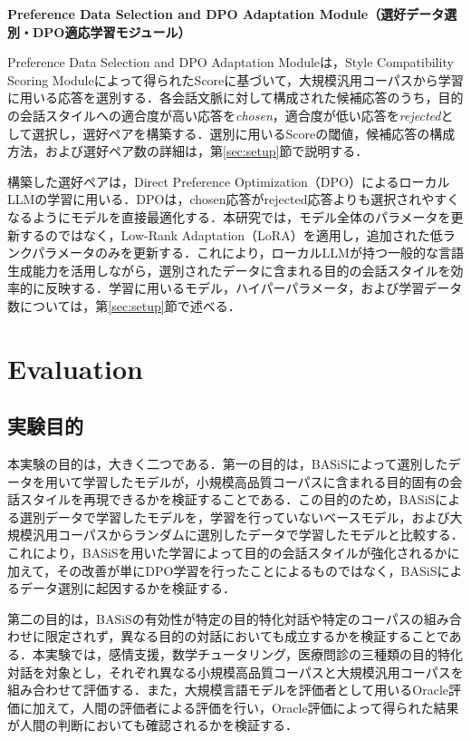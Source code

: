 \documentclass[manuscript,review,anonymous]{acmart}
\begin{document}
\label{mod:preference_adaptation}
\noindent\textbf{Preference Data Selection and DPO Adaptation Module（選好データ選別・DPO適応学習モジュール）}\par

Preference Data Selection and DPO Adaptation Moduleは，Style Compatibility Scoring Moduleによって得られたScoreに基づいて，大規模汎用コーパスから学習に用いる応答を選別する．各会話文脈に対して構成された候補応答のうち，目的の会話スタイルへの適合度が高い応答を\emph{chosen}，適合度が低い応答を\emph{rejected}として選択し，選好ペアを構築する．選別に用いるScoreの閾値，候補応答の構成方法，および選好ペア数の詳細は，第\ref{sec:setup}節で説明する．

構築した選好ペアは，Direct Preference Optimization（DPO）\cite{rafailov2023dpo}によるローカルLLMの学習に用いる．DPOは，chosen応答がrejected応答よりも選択されやすくなるようにモデルを直接最適化する．本研究では，モデル全体のパラメータを更新するのではなく，Low-Rank Adaptation（LoRA）\cite{hu2021lora}を適用し，追加された低ランクパラメータのみを更新する．これにより，ローカルLLMが持つ一般的な言語生成能力を活用しながら，選別されたデータに含まれる目的の会話スタイルを効率的に反映する．学習に用いるモデル，ハイパーパラメータ，および学習データ数については，第\ref{sec:setup}節で述べる．


\section{Evaluation}
\label{sec:evaluation}
\label{sec:setup}

\subsection{実験目的}
\label{sec:eval_objectives}

本実験の目的は，大きく二つである．第一の目的は，BASiSによって選別したデータを用いて学習したモデルが，小規模高品質コーパスに含まれる目的固有の会話スタイルを再現できるかを検証することである．この目的のため，BASiSによる選別データで学習したモデルを，学習を行っていないベースモデル，および大規模汎用コーパスからランダムに選別したデータで学習したモデルと比較する．これにより，BASiSを用いた学習によって目的の会話スタイルが強化されるかに加えて，その改善が単にDPO学習を行ったことによるものではなく，BASiSによるデータ選別に起因するかを検証する．

第二の目的は，BASiSの有効性が特定の目的特化対話や特定のコーパスの組み合わせに限定されず，異なる目的の対話においても成立するかを検証することである．本実験では，感情支援，数学チュータリング，医療問診の三種類の目的特化対話を対象とし，それぞれ異なる小規模高品質コーパスと大規模汎用コーパスを組み合わせて評価する．また，大規模言語モデルを評価者として用いるOracle評価に加えて，人間の評価者による評価を行い，Oracle評価によって得られた結果が人間の判断においても確認されるかを検証する．
\end{document}
